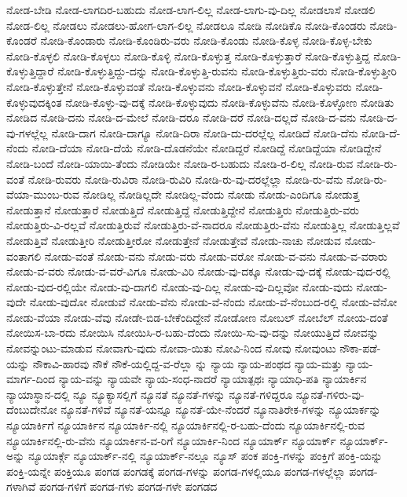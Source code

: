 {ನೋಡ-ಬೇಡಿ
ನೋಡ-ಲಾಗದಿರ-ಬಹುದು
ನೋಡ-ಲಾಗ-ಲಿಲ್ಲ
ನೋಡ-ಲಾಗು-ವು-ದಿಲ್ಲ
ನೋಡಲಾಸೆ
ನೋಡಲಿ
ನೋಡ-ಲಿಲ್ಲ
ನೋಡಲು
ನೋಡಲು-ಹೋಗ-ಲಾಗ-ಲಿಲ್ಲ
ನೋಡಲೂ
ನೋಡಿ
ನೋಡಿಕೊ
ನೋಡಿ-ಕೊಂಡರು
ನೋಡಿ-ಕೊಂಡರೆ
ನೋಡಿ-ಕೊಂಡಾರು
ನೋಡಿ-ಕೊಂಡಿರು-ವರು
ನೋಡಿ-ಕೊಂಡು
ನೋಡಿ-ಕೊಳ್ಳ
ನೋಡಿ-ಕೊಳ್ಳ-ಬೇಕು
ನೋಡಿ-ಕೊಳ್ಳಲಿ
ನೋಡಿ-ಕೊಳ್ಳಲು
ನೋಡಿ-ಕೊಳ್ಳಿ
ನೋಡಿ-ಕೊಳ್ಳುತ್ತ
ನೋಡಿ-ಕೊಳ್ಳುತ್ತಾರೆ
ನೋಡಿ-ಕೊಳ್ಳುತ್ತಿದ್ದ
ನೋಡಿ-ಕೊಳ್ಳುತ್ತಿದ್ದಾರೆ
ನೋಡಿ-ಕೊಳ್ಳುತ್ತಿದ್ದು-ದನ್ನು
ನೋಡಿ-ಕೊಳ್ಳುತ್ತಿ-ರುವನು
ನೋಡಿ-ಕೊಳ್ಳುತ್ತಿರು-ವರು
ನೋಡಿ-ಕೊಳ್ಳುತ್ತೀರಿ
ನೋಡಿ-ಕೊಳ್ಳುತ್ತೇನೆ
ನೋಡಿ-ಕೊಳ್ಳುವಂತೆ
ನೋಡಿ-ಕೊಳ್ಳುವನು
ನೋಡಿ-ಕೊಳ್ಳುವನೆ
ನೋಡಿ-ಕೊಳ್ಳುವರು
ನೋಡಿ-ಕೊಳ್ಳುವುದಕ್ಕಿಂತ
ನೋಡಿ-ಕೊಳ್ಳು-ವು-ದಕ್ಕೆ
ನೋಡಿ-ಕೊಳ್ಳುವುದು
ನೋಡಿ-ಕೊಳ್ಳುವೆನು
ನೋಡಿ-ಕೊಳ್ಳೋಣ
ನೋಡಿತು
ನೋಡಿದ
ನೋಡಿ-ದನು
ನೋಡಿ-ದ-ಮೇಲೆ
ನೋಡಿ-ದರೂ
ನೋಡಿ-ದರೆ
ನೋಡಿ-ದಲ್ಲದೆ
ನೋಡಿ-ದ-ವನು
ನೋಡಿ-ದ-ವು-ಗಳಲ್ಲೆಲ್ಲ
ನೋಡಿ-ದಾಗ
ನೋಡಿ-ದಾಗ್ಯೂ
ನೋಡಿ-ದಿರಾ
ನೋಡಿ-ದು-ದರಲ್ಲೆಲ್ಲ
ನೋಡಿದೆ
ನೋಡಿ-ದೆನು
ನೋಡಿ-ದೆ-ನೆಂದು
ನೋಡಿ-ದೆಯಾ
ನೋಡಿ-ದೆಯೆ
ನೋಡಿ-ದೊಡನೆಯೇ
ನೋಡಿದ್ದರೆ
ನೋಡಿದ್ದೆ
ನೋಡಿದ್ದೆಯಾ
ನೋಡಿದ್ದೇನೆ
ನೋಡಿ-ಬಂದೆ
ನೋಡಿ-ಯಾಯಿ-ತೆಂದು
ನೋಡಿಯೇ
ನೋಡಿ-ರ-ಬಹುದು
ನೋಡಿ-ರ-ಲಿಲ್ಲ
ನೋಡಿ-ರುವ
ನೋಡಿ-ರು-ವಂತೆ
ನೋಡಿ-ರುವರು
ನೋಡಿ-ರುವಿರಾ
ನೋಡಿ-ರುವಿರಿ
ನೋಡಿ-ರು-ವು-ದರಲ್ಲೆಲ್ಲಾ
ನೋಡಿ-ರು-ವೆನು
ನೋಡಿ-ರು-ವೆಯಾ-ಮುಂಬ-ರುವ
ನೋಡಿಲ್ಲ
ನೋಡಿಲ್ಲದೇ
ನೋಡಿಲ್ಲ-ವೆಂದು
ನೋಡು
ನೋಡು-ಎಂದಿಗೂ
ನೋಡುತ್ತ
ನೋಡುತ್ತಾನೆ
ನೋಡುತ್ತಾರೆ
ನೋಡುತ್ತಿದೆ
ನೋಡುತ್ತಿದ್ದೆ
ನೋಡುತ್ತಿದ್ದೇನೆ
ನೋಡುತ್ತಿರು
ನೋಡುತ್ತಿರು-ವರು
ನೋಡುತ್ತಿರು-ವಿ-ರಲ್ಲವೆ
ನೋಡುತ್ತಿರುವೆ
ನೋಡುತ್ತಿರು-ವೆ-ನಾದರೂ
ನೋಡುತ್ತಿರು-ವೆನು
ನೋಡುತ್ತಿಲ್ಲ
ನೋಡುತ್ತಿಲ್ಲವೆ
ನೋಡುತ್ತಿವೆ
ನೋಡುತ್ತೀರಿ
ನೋಡುತ್ತೀರೋ
ನೋಡುತ್ತೇನೆ
ನೋಡುತ್ತೇವೆ
ನೋಡು-ನಾಚು
ನೋಡುವ
ನೋಡು-ವಂತಾಗಲಿ
ನೋಡು-ವಂತೆ
ನೋಡು-ವನು
ನೋಡು-ವರು
ನೋಡು-ವರೋ
ನೋಡು-ವ-ವನು
ನೋಡು-ವ-ವರಾರು
ನೋಡು-ವ-ವರು
ನೋಡು-ವ-ವರೆ-ವಿಗೂ
ನೋಡು-ವಿರಿ
ನೋಡು-ವು-ದಕ್ಕೂ
ನೋಡು-ವು-ದಕ್ಕೆ
ನೋಡು-ವುದ-ರಲ್ಲಿ
ನೋಡು-ವುದ-ರಲ್ಲಿಯೇ
ನೋಡು-ವು-ದಾಗಲಿ
ನೋಡು-ವು-ದಿಲ್ಲ
ನೋಡು-ವು-ದಿಲ್ಲವೋ
ನೋಡು-ವುದು
ನೋಡು-ವುದೇ
ನೋಡು-ವುದೋ
ನೋಡುವೆ
ನೋಡು-ವೆನು
ನೋಡು-ವೆ-ನೆಂದು
ನೋಡು-ವೆ-ನೆಂಬುದ-ರಲ್ಲಿ
ನೋಡು-ವೆನೋ
ನೋಡು-ವೆಯಾ
ನೋಡು-ವೆವು
ನೋಡೇ-ಬಿಡ-ಬೇಕೆಂದಿದ್ದೇನೆ
ನೋಡೋಣ
ನೋಬಲ್
ನೋಬೆಲ್
ನೋಯ-ದಂತೆ
ನೋಯಿಸ-ಬಾ-ರದು
ನೋಯಿಸಿ
ನೋಯಿಸಿ-ರ-ಬಹು-ದೆಂದು
ನೋಯಿ-ಸು-ವು-ದನ್ನು
ನೋಯುತ್ತಿದೆ
ನೋವನ್ನು
ನೋವನ್ನುಂಟು-ಮಾಡುವ
ನೋವಾಗು-ವುದು
ನೋವಾ-ಯಿತು
ನೋವಿ-ನಿಂದ
ನೋವು
ನೋವುಂಟು
ನೌಕಾ-ಪಡೆ-ಯನ್ನು
ನೌಕಾವಿ-ಹಾರವು
ನೌಕೆ
ನೌಕೆ-ಯಲ್ಲಿದ್ದ-ವ-ರೆಲ್ಲಾ
ನ್ನು
ನ್ಯಾಯ
ನ್ಯಾಯ-ಪಂಥದ
ನ್ಯಾಯ-ಮತ್ತು
ನ್ಯಾಯ-ಮಾರ್ಗ-ದಿಂದ
ನ್ಯಾಯ-ವನ್ನು
ನ್ಯಾಯವೇ
ನ್ಯಾಯ-ಸಂಧ-ನಾದರೆ
ನ್ಯಾಯಾತ್ಪಥಃ
ನ್ಯಾಯಾಧಿ-ಪತಿ
ನ್ಯಾಯಾರ್ಕಿನ
ನ್ಯಾಯಾಸ್ಥಾನ-ದಲ್ಲಿ
ನ್ಯೂ
ನ್ಯೂಕ್ಯಾಸಲ್ಲಿಗೆ
ನ್ಯೂನತೆ
ನ್ಯೂನತೆ-ಗಳನ್ನು
ನ್ಯೂನತೆ-ಗಳಿದ್ದರೂ
ನ್ಯೂನತೆ-ಗಳಿರು-ವು-ದೆಂಬುದೇನೋ
ನ್ಯೂನತೆ-ಗಳಿವೆ
ನ್ಯೂನತೆ-ಯನ್ನೂ
ನ್ಯೂನತೆ-ಯೇ-ನೆಂದರೆ
ನ್ಯೂನಾತಿರೇಕ-ಗಳನ್ನು
ನ್ಯೂಯಾರ್ಕನ್ನು
ನ್ಯೂಯಾರ್ಕಿಗೆ
ನ್ಯೂಯಾರ್ಕಿನ
ನ್ಯೂಯಾರ್ಕಿ-ನಲ್ಲಿ
ನ್ಯೂಯಾರ್ಕಿನಲ್ಲಿ-ರ-ಬಹು-ದೆಂದು
ನ್ಯೂಯಾರ್ಕಿನಲ್ಲಿ-ರುವ
ನ್ಯೂಯಾರ್ಕಿನಲ್ಲಿ-ರು-ವೆನು
ನ್ಯೂಯಾರ್ಕಿನ-ವ-ರಿಗೆ
ನ್ಯೂಯಾರ್ಕಿ-ನಿಂದ
ನ್ಯೂಯಾರ್ಕ್
ನ್ಯೂಯಾರ್ಕ್
ನ್ಯೂಯಾರ್ಕ್-ಅನ್ನು
ನ್ಯೂಯಾರ್ಕ್ಗೆ
ನ್ಯೂಯಾರ್ಕ್-ನಲ್ಲಿ
ನ್ಯೂಯಾರ್ಕ್-ನಲ್ಲೂ
ನ್ಯೂಸ್
ಪಂಕ
ಪಂಕ್ತಿ-ಗಳನ್ನು
ಪಂಕ್ತಿಗೆ
ಪಂಕ್ತಿ-ಯನ್ನು
ಪಂಕ್ತಿ-ಯನ್ನೇ
ಪಂಕ್ತಿಯೂ
ಪಂಗಡ
ಪಂಗಡಕ್ಕೆ
ಪಂಗಡ-ಗಳನ್ನು
ಪಂಗಡ-ಗಳಲ್ಲಿಯೂ
ಪಂಗಡ-ಗಳಲ್ಲೆಲ್ಲಾ
ಪಂಗಡ-ಗಳಾಗಿವೆ
ಪಂಗಡ-ಗಳಿಗೆ
ಪಂಗಡ-ಗಳು
ಪಂಗಡ-ಗಳೇ
ಪಂಗಡದ
}
